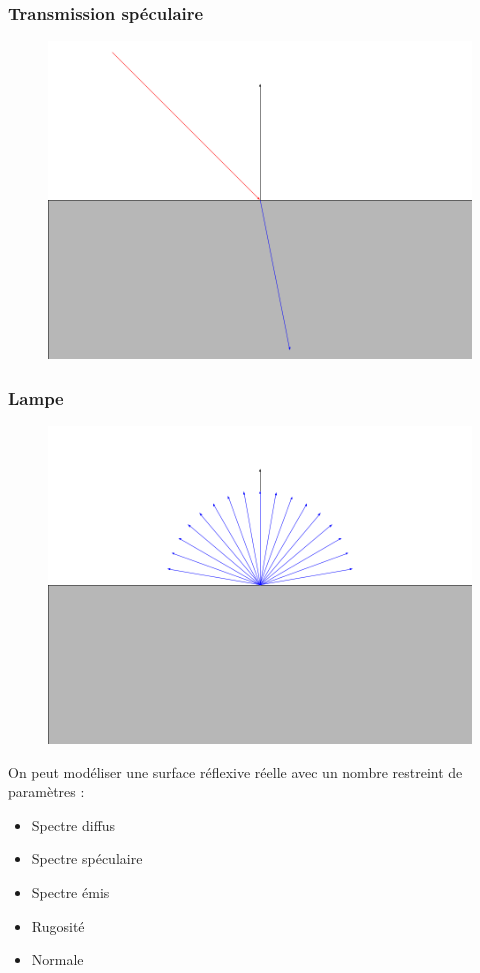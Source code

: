 \documentclass[handout]{beamer}
\begin{document}
\begin{frame}
    \frametitle{Transmission spéculaire}
    \begin{figure}
        \includegraphics[scale=0.3]{Dielectrique.png}
    \end{figure}
\end{frame}

\begin{frame}
    \frametitle{Lampe}
    \begin{figure}
        \includegraphics[scale=0.3]{Lampe.png}
    \end{figure}
\end{frame}

\begin{frame}
    On peut modéliser une surface réflexive réelle avec un nombre restreint de paramètres :
    \begin{itemize}
        \item Spectre diffus
        \item Spectre spéculaire
        \item Spectre émis
        \item Rugosité
        \item Normale
    \end{itemize}
\end{frame}
\end{document}
